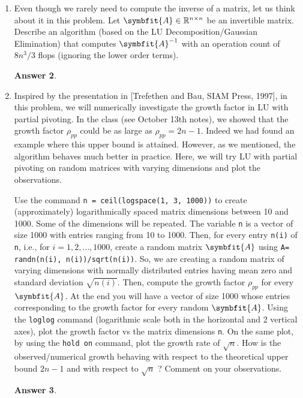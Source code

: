 \documentclass{article}
\theoremstyle{definition}
\newtheorem*{answer}{Answer}
\newcommand{\reals}{\mathbb{R}}
\newcommand{\mat}[1]{\symbfit{#1}}
\begin{document}
\begin{enumerate}[leftmargin=\labelsep]
\begin{enumerate}
		      \item Write a Matlab code to implement the UL decomposition and apply it to
		            \[
			            \mqty[1&0&2&1\\-4&5&3&-1\\-1&3&1&1\\0&2&0&1]
		            \]
		            to verify that your code generates the required decomposition \(\mat{A} = \mat{U}\mat{L}\).
		            \begin{answer}
		            \end{answer}
	      \end{enumerate}

	\item Even though we rarely need to compute the inverse of a matrix, let us think about it in this problem. Let \(\mat{A} \in \reals^{n\times n}\) be an invertible matrix. Describe an algorithm (based on the LU Decomposition/Gaussian Elimination) that computes \(\mat{A}^{-1}\) with an operation count of \(8n^3/3\) flops (ignoring the lower order terms).
	      \begin{answer}
	      \end{answer}

	\item Inspired by the presentation in [Trefethen and Bau, SIAM Press, 1997], in this problem, we will numerically investigate the growth factor in LU with partial pivoting. In the class (see October 13th notes), we showed that the growth factor \(\rho_{pp}\) could be as large as \(\rho_{pp} = 2n-1\). Indeed we had found an example where this upper bound is attained. However, as we mentioned, the algorithm behaves much better in practice. Here, we will try LU with partial pivoting on random matrices with varying dimensions and plot the observations.

	      Use the command \texttt{n = ceil(logspace(1, 3, 1000))} to create (approximately) logarithmically spaced matrix dimensions between 10 and 1000. Some of the dimensions will be repeated. The variable \texttt{n} is a vector of size 1000 with entries ranging from 10 to 1000. Then, for every entry \texttt{n(i)} of \texttt{n}, i.e., for \(i = 1, 2, \dots , 1000\), create a random matrix \(\mat{A}\) using \texttt{A= randn(n(i), n(i))/sqrt(n(i))}. So, we are creating a random matrix of varying dimensions with normally distributed entries having mean zero and standard deviation \(\sqrt{n(i)}\). Then, compute the growth factor \(\rho_{pp}\) for every \(\mat{A}\). At the end you will have a vector of size 1000 whose entries corresponding to the growth factor for every random \(\mat{A}\). Using the \texttt{loglog} command (logarithmic scale both in the horizontal and 2 vertical axes), plot the growth factor vs the matrix dimensions \texttt{n}. On the same plot, by using the \texttt{hold on} command, plot the growth rate of \(\sqrt{n}\). How is the observed/numerical growth behaving with respect to the theoretical upper bound \(2n-1\) and with respect to \(\sqrt{n}\) ? Comment on your observations.
	      \begin{answer}
	      \end{answer}
\end{enumerate}
\end{document}
